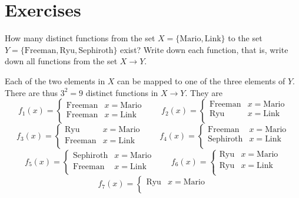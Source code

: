 \section*{Exercises}

\begin{excersizelist}

\item How many distinct functions from the set $X = \{\text{Mario}, \text{Link}\}$ to the set $Y = \{\text{Freeman}, \text{Ryu}, \text{Sephiroth}\}$ exist?  Write down each function, that is, write down all functions from the set $X \to Y$.

\begin{solution}
Each of the two elements in $X$ can be mapped to one of the three elements of $Y$.  There are thus $3^2 = 9$ distinct functions in $X \to Y$.  They are
\[
f_1(x) = \begin{cases}
\text{Freeman} & x = \text{Mario} \\
\text{Freeman} & x = \text{Link} \\
\end{cases}
\qquad 
f_2(x) = \begin{cases}
\text{Freeman} & x = \text{Mario} \\
\text{Ryu} & x = \text{Link} \\
\end{cases}
\]
\[
f_3(x) = \begin{cases}
\text{Ryu} & x = \text{Mario} \\
\text{Freeman} & x = \text{Link} \\
\end{cases}
\qquad 
f_4(x) = \begin{cases}
\text{Freeman} & x = \text{Mario} \\
\text{Sephiroth} & x = \text{Link} \\
\end{cases}
\]
\[
f_5(x) = \begin{cases}
\text{Sephiroth} & x = \text{Mario} \\
\text{Freeman} & x = \text{Link} \\
\end{cases}
\qquad 
f_6(x) = \begin{cases}
\text{Ryu} & x = \text{Mario} \\
\text{Ryu} & x = \text{Link} \\
\end{cases}
\]
\[
f_7(x) = \begin{cases}
\text{Ryu} & x = \text{Mario} \\

\end{cases}\]
\end{solution}
\end{excersizelist}
